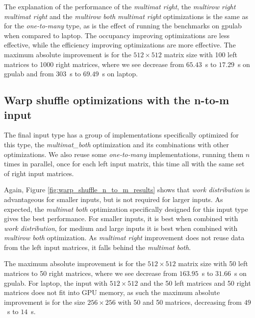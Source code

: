 The explanation of the performance of the \textit{multimat right}, the \textit{multirow right multimat right} and the \textit{multirow both multimat right} optimizations is the same as for the \textit{one-to-many} type, as is the effect of running the benchmarks on gpulab when compared to laptop. The occupancy improving optimizations are less effective, while the efficiency improving optimizations are more effective. %
The maximum absolute improvement is for the $512 \times 512$ matrix size with 100 left matrices to 1000 right matrices, where we see decrease from $65.43$~s to $17.29$~s on gpulab and from $303$~s to $69.49$~s on laptop.


\subsection{Warp shuffle optimizations with the n-to-m input}
The final input type has a group of implementations specifically optimized for this type, the \textit{multimat\_both} optimization and its combinations with other optimizations. We also reuse some \textit{one-to-many} implementations, running them $n$ times in parallel, once for each left input matrix, this time all with the same set of right input matrices.

Again, Figure \ref{fig:warp_shuffle_n_to_m_results} shows that \textit{work distribution} is advantageous for smaller inputs, but is not required for larger inputs. As expected, the \textit{multimat both} optimization specifically designed for this input type gives the best performance. For smaller inputs, it is best when combined with \textit{work distribution}, for medium and large inputs it is best when combined with \textit{multirow both} optimization. As \textit{multimat right} improvement does not reuse data from the left input matrices, it falls behind the \textit{multimat both}.

The maximum absolute improvement is for the $512 \times 512$ matrix size with 50 left matrices to 50 right matrices, where we see decrease from $163.95$~s to $31.66$~s on gpulab. For laptop, the input with $512 \times 512$ and the 50 left matrices and 50 right matrices does not fit into GPU memory, as such the maximum absolute improvement is for the size $256 \times 256$ with 50 and 50 matrices, decreasing from $49$~s to $14$~s.

